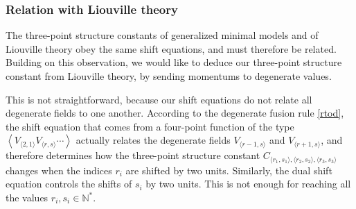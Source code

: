 \documentclass[12pt, a4paper, notitlepage, twoside]{report}
\numberwithin{equation}{section}
\theoremstyle{break}
\begin{document}
\subsubsection{Relation with Liouville theory}

The three-point structure constants of generalized minimal models and of Liouville theory obey the same shift equations, and must therefore be related. Building on this observation, we would like to deduce our three-point structure constant from Liouville theory, by sending momentums to degenerate values. 

This is not straightforward, because our shift equations do not relate all degenerate fields to one another. According to the degenerate fusion rule \eqref{rtod}, the shift equation that comes from a four-point function of the type $\left< V_{\langle 2,1\rangle}V_{\langle r,s\rangle}\cdots \right>$ actually relates the degenerate fields $V_{\langle r-1,s\rangle}$ and $V_{\langle r+1,s\rangle}$, and therefore determines how the three-point structure constant $C_{\langle r_1,s_1\rangle ,\langle r_2,s_2\rangle ,\langle r_3,s_3 \rangle}$ changes when the indices $r_i$ are shifted by two units.
Similarly, the dual shift equation controls the shifts of $s_i$ by two units. This is not enough for reaching all the values $r_i,s_i\in \mathbb{N}^*$.
\end{document}
